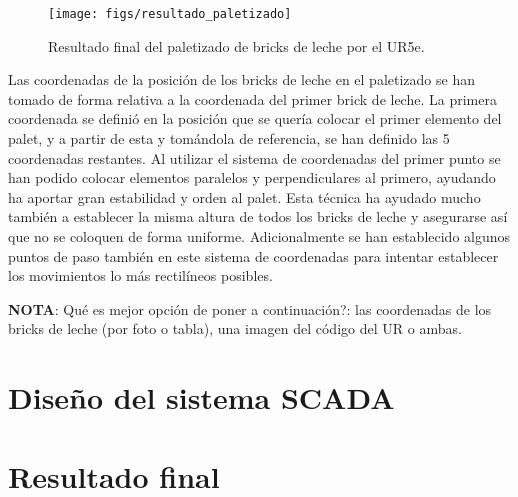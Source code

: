 \begin{figure}[h!]
  \begin{center}
  	\texttt{[image: figs/resultado\_paletizado]}
  \end{center}
  \caption{\centering Resultado final del paletizado de bricks de leche por el UR5e.}
  \label{fig:resultado_paletizado}
\end{figure}

Las coordenadas de la posición de los bricks de leche en el paletizado se han tomado de forma relativa a la coordenada del primer brick de leche. La primera coordenada se definió en la posición que se quería colocar el primer elemento del palet, y a partir de esta y tomándola de referencia, se han definido las 5 coordenadas restantes. Al utilizar el sistema de coordenadas del primer punto se han podido colocar elementos paralelos y perpendiculares al primero, ayudando ha aportar gran estabilidad y orden al palet. Esta técnica ha ayudado mucho también a establecer la misma altura de todos los bricks de leche y asegurarse así que no se coloquen de forma uniforme. Adicionalmente se han establecido algunos puntos de paso también en este sistema de coordenadas para intentar establecer los movimientos lo más rectilíneos posibles. 

\textbf{NOTA}: Qué es mejor opción de poner a continuación?: las coordenadas de los bricks de leche (por foto o tabla), una imagen del código del UR o ambas.

\clearpage
\section{Diseño del sistema SCADA}
\label{sec:diseño_scada}



\section{Resultado final}
\label{sec:resultado_final}





